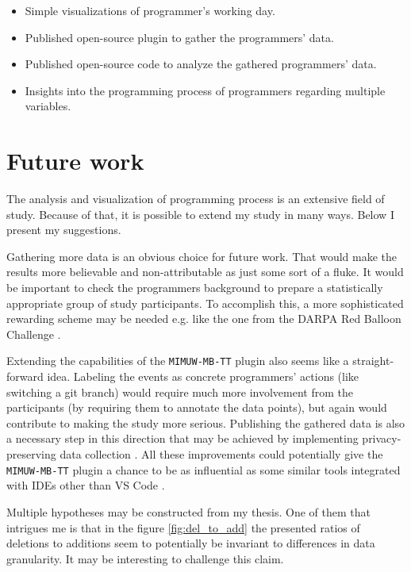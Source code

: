 \begin{itemize}
    \item Simple visualizations of programmer's working day.
    \item Published open-source plugin to gather the programmers' data.
    \item Published open-source code to analyze the gathered programmers' data.
    \item Insights into the programming process of programmers regarding multiple variables.
\end{itemize}

\section{Future work}

The analysis and visualization of programming process is an extensive field of study. Because of that, it is possible to extend my study in many ways. Below I present my suggestions.

Gathering more data is an obvious choice for future work. That would make the results more believable and non-attributable as just some sort of a fluke. It would be important to check the programmers background to prepare a statistically appropriate group of study participants. To accomplish this, a more sophisticated rewarding scheme may be needed e.g. like the one from the DARPA Red Balloon Challenge \cite{Tan11DARPABallons}.

Extending the capabilities of the \texttt{MIMUW-MB-TT} plugin also seems like a straight-forward idea. Labeling the events as concrete programmers' actions (like switching a git branch) would require much more involvement from the participants (by requiring them to annotate the data points), but again would contribute to making the study more serious. Publishing the gathered data is also a necessary step in this direction that may be achieved by implementing privacy-preserving data collection \cite{Cao20PrivacyCol}. All these improvements could potentially give the \texttt{MIMUW-MB-TT} plugin a chance to be as influential as some similar tools integrated with IDEs other than VS Code \cite{Ama16FeedBaG, Yoon11Fluorite, Min13DFlow}.

Multiple hypotheses may be constructed from my thesis. One of them that intrigues me is that in the figure \ref{fig:del_to_add} the presented ratios of deletions to additions seem to potentially be invariant to differences in data granularity. It may be interesting to challenge this claim.
